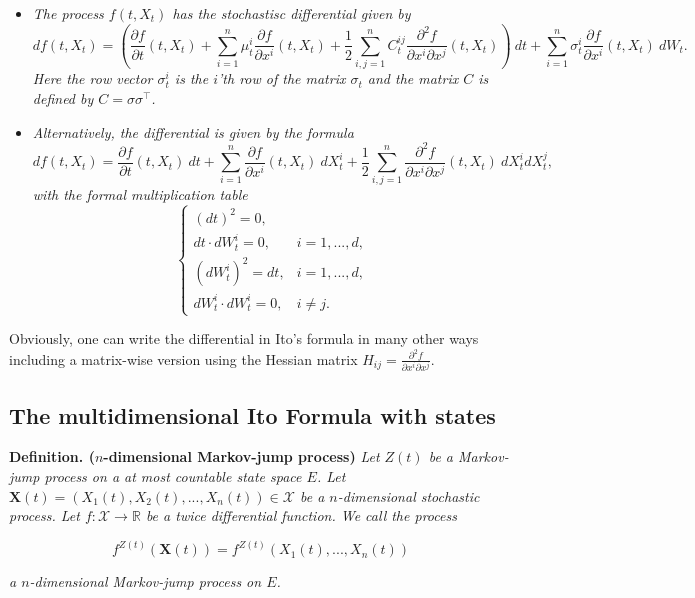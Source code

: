 \documentclass[a4paper,12pt,openany]{book}
\providecommand{\tightlist}{%
 \setlength{\itemsep}{0pt}\setlength{\parskip}{0pt}}
\begin{document}
\begin{itemize}
\tightlist
\item
  \emph{The process \(f(t,X_t)\) has the stochastisc differential given by}
  \[
    df(t,X_t)=\left(\frac{\partial f}{\partial t}(t,X_t) + \sum_{i=1}^n\mu^i_t\frac{\partial f}{\partial x^i}(t,X_t) + \frac{1}{2}\sum_{i,j=1}^nC_t^{ij}\frac{\partial^2 f}{\partial x^i\partial x^j}(t,X_t)\right)\ dt+\sum_{i=1}^n\sigma^i_t\frac{\partial f}{\partial x^i}(t,X_t)\ dW_t.
    \]
  \emph{Here the row vector \(\sigma^i_t\) is the \(i\)'th row of the matrix \(\sigma_t\) and the matrix \(C\) is defined by \(C=\sigma\sigma^\top\).}
\item
  \emph{Alternatively, the differential is given by the formula}
  \[
    df(t,X_t)=\frac{\partial f}{\partial t}(t,X_t)\ dt + \sum_{i=1}^n\frac{\partial f}{\partial x^i}(t,X_t)\ dX^i_t + \frac{1}{2}\sum_{i,j=1}^n\frac{\partial^2 f}{\partial x^i\partial x^j}(t,X_t)\ dX^i_tdX^j_t,
    \]
  \emph{with the formal multiplication table}
  \[
    \left\{\begin{matrix}(dt)^2=0,\\  dt\cdot dW_t^i=0, & i = 1,...,d,\\ (dW_t^i)^2=dt, & i=1,...,d, \\ dW_t^i\cdot dW_t^i =0, & i\ne j.\end{matrix}\right.
    \]
\end{itemize}

Obviously, one can write the differential in Ito's formula in many other ways including a matrix-wise version using the Hessian matrix \(H_{ij}=\frac{\partial^2 f}{\partial x^i\partial x^j}\).

\hypertarget{the-multidimensional-ito-formula-with-states}{%
\subsection{The multidimensional Ito Formula with states}\label{the-multidimensional-ito-formula-with-states}}

\textbf{Definition. (\(n\)-dimensional Markov-jump process)} \emph{Let \(Z(t)\) be a Markov-jump process on a at most countable state space \(E\). Let \(\mathbf X(t)=(X_1(t),X_2(t),...,X_n(t))\in\mathcal X\) be a \(n\)-dimensional stochastic process. Let \(f : \mathcal X\to \mathbb R\) be a twice differential function. We call the process}

\[
f^{Z(t)}(\mathbf X(t))=f^{Z(t)}(X_1(t),...,X_n(t))
\]

\emph{a \(n\)-dimensional Markov-jump process on \(E\).}
\end{document}
